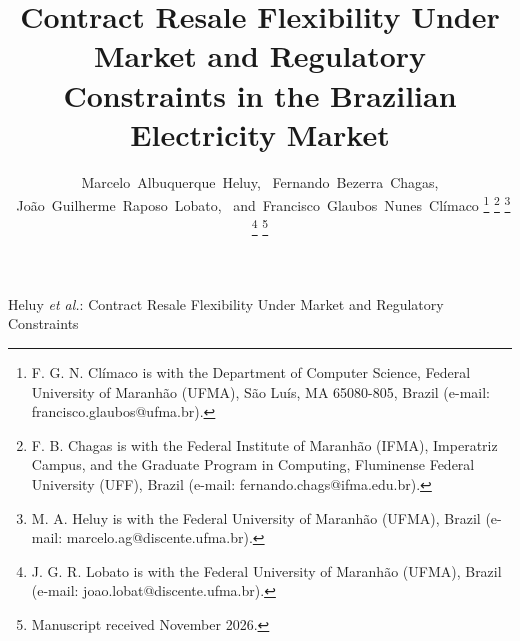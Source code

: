 \documentclass[10pt,journal]{IEEEtran}
\begin{document}
\title{Contract Resale Flexibility Under Market and Regulatory Constraints in the Brazilian Electricity Market}

\author{Marcelo~Albuquerque~Heluy,%
        ~Fernando~Bezerra~Chagas,%
        ~Jo\~ao~Guilherme~Raposo~Lobato,%
        ~and~Francisco~Glaubos~Nunes~Cl\'imaco%
\thanks{F. G. N. Cl\'imaco is with the Department of Computer Science, Federal University of Maranh\~ao (UFMA), S\~ao Lu\'is, MA 65080-805, Brazil (e-mail: francisco.glaubos@ufma.br).}%
\thanks{F. B. Chagas is with the Federal Institute of Maranh\~ao (IFMA), Imperatriz Campus, and the Graduate Program in Computing, Fluminense Federal University (UFF), Brazil (e-mail: fernando.chags@ifma.edu.br).}%
\thanks{M. A. Heluy is with the Federal University of Maranh\~ao (UFMA), Brazil (e-mail: marcelo.ag@discente.ufma.br).}%
\thanks{J. G. R. Lobato is with the Federal University of Maranh\~ao (UFMA), Brazil (e-mail: joao.lobat@discente.ufma.br).}%
\thanks{Manuscript received November 2026.}}

%
{Heluy \MakeLowercase{\textit{et al.}}: Contract Resale Flexibility Under Market and Regulatory Constraints}
\end{document}
